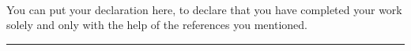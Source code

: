 %
~\label{sec:declaration}
\thispagestyle{empty}

You can put your declaration here, to declare that you have completed your work solely and only with the help of the references you mentioned.

\bigskip

\smallskip

\begin{flushright}
	\begin{minipage}{5cm}
		\rule{\textwidth}{1pt}
		\centering\thesisName{}
	\end{minipage}
\end{flushright}

